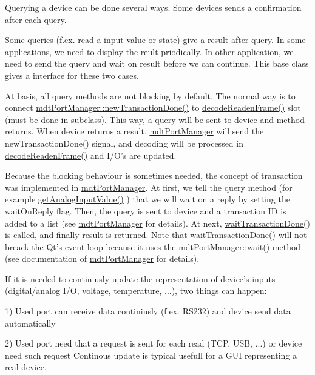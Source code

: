 Querying a device can be done several ways. Some devices sends a confirmation after each query.

Some queries (f.ex. read a input value or state) give a result after query. In some applications, we need to display the reult priodically. In other application, we need to send the query and wait on result before we can continue. This base class gives a interface for these two cases.

At basis, all query methods are not blocking by default. The normal way is to connect \hyperlink{classmdt_port_manager_a416a24db1048e9f66aef27ea810954d2}{mdtPortManager::newTransactionDone()} to \hyperlink{classmdt_device_ad211ba3be781c3db0397d5bf91f796d1}{decodeReadenFrame()} slot (must be done in subclass). This way, a query will be sent to device and method returns. When device returns a result, \hyperlink{classmdt_port_manager}{mdtPortManager} will send the newTransactionDone() signal, and decoding will be processed in \hyperlink{classmdt_device_ad211ba3be781c3db0397d5bf91f796d1}{decodeReadenFrame()} and I/O's are updated.

Because the blocking behaviour is sometimes needed, the concept of transaction was implemented in \hyperlink{classmdt_port_manager}{mdtPortManager}. At first, we tell the query method (for example \hyperlink{classmdt_device_ab828764660ba53ffce1995901ddf5a0a}{getAnalogInputValue()} ) that we will wait on a reply by setting the waitOnReply flag. Then, the query is sent to device and a transaction ID is added to a list (see \hyperlink{classmdt_port_manager}{mdtPortManager} for details). At next, \hyperlink{classmdt_device_ab937015c1a319b7234442a4cc29a02a8}{waitTransactionDone()} is called, and finally result is returned. Note that \hyperlink{classmdt_device_ab937015c1a319b7234442a4cc29a02a8}{waitTransactionDone()} will not breack the Qt's event loop because it uses the mdtPortManager::wait() method (see documentation of \hyperlink{classmdt_port_manager}{mdtPortManager} for details).

If it is needed to continiusly update the representation of device's inputs (digital/analog I/O, voltage, temperature, ...), two things can happen:
\begin{DoxyItemize}
\item 1) Used port can receive data continiusly (f.ex. RS232) and device send data automatically
\item 2) Used port need that a request is sent for each read (TCP, USB, ...) or device need such request Continous update is typical usefull for a GUI representing a real device.
\end{DoxyItemize}

